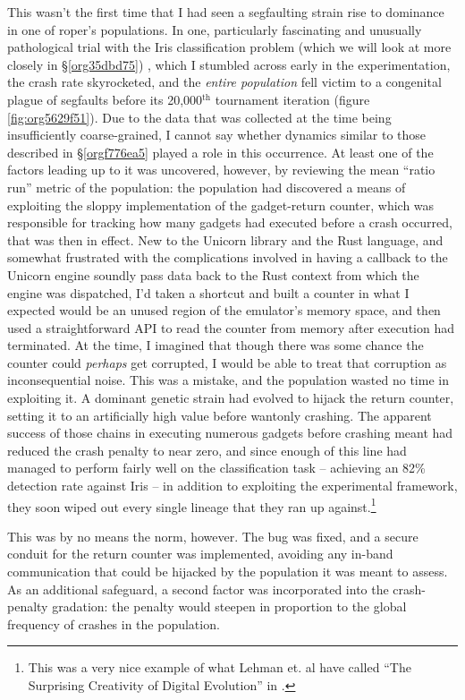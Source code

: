 \documentclass[12pt,glossary]{dalthesis}
\begin{document}
This wasn't the first time that I had seen a segfaulting strain rise to
dominance in one of \gls{roper}'s populations. In one, particularly fascinating
and unusually pathological trial with the Iris classification problem (which we
will look at more closely in \S \ref{org35dbd75}) , which I stumbled
across early in the experimentation, the crash rate skyrocketed, and the \emph{entire
population} fell victim to a congenital plague of segfaults before its
20,000\(^{\text{th}}\) tournament iteration (figure \ref{fig:org5629f51}). Due to the data that
was collected at the time being insufficiently coarse-grained, I cannot say
whether dynamics similar to those described in \S \ref{orgf776ea5} played
a role in this occurrence. At least one of the factors leading up to it was
uncovered, however, by reviewing the mean ``ratio run'' metric of the population:
the population had discovered a means of exploiting the sloppy implementation of
the gadget-return counter, which was responsible for tracking how many gadgets
had executed before a crash occurred, that was then in effect. New to the
Unicorn library and the Rust language, and somewhat frustrated with the
complications involved in having a callback to the Unicorn engine soundly pass
data back to the Rust context from which the engine was dispatched, I'd taken a
shortcut and built a counter in what I expected would be an unused region of the
emulator's memory space, and then used a straightforward API to read the counter
from memory after execution had terminated. At the time, I imagined that though
there was some chance the counter could \emph{perhaps} get corrupted, I would be able
to treat that corruption as inconsequential noise. This was a mistake, and the
population wasted no time in exploiting it. A dominant genetic strain had
evolved to hijack the return counter, setting it to an artificially high value
before wantonly crashing. The apparent success of those chains in executing
numerous gadgets before crashing meant had reduced the crash penalty to near
zero, and since enough of this line had managed to perform fairly well on the
classification task -- achieving an 82\% detection rate against Iris -- in
addition to exploiting the experimental framework, they soon wiped out every
single lineage that they ran up against.\footnote{This was a very nice example of
what Lehman et. al have called ``The Surprising Creativity of Digital Evolution''
in \cite{lehman18}.}

This was by no means the norm, however. The bug was fixed, and a secure conduit
for the return counter was implemented, avoiding any in-band communication that
could be hijacked by the population it was meant to assess. As an additional
safeguard, a second factor was incorporated into the crash-penalty gradation:
the penalty would steepen in proportion to the global frequency of crashes in
the population. 
\end{document}
